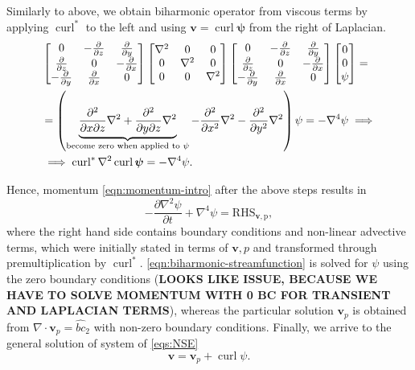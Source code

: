 \documentclass{article}
\numberwithin{equation}{section}
\begin{document}
Similarly to above, we obtain biharmonic operator from viscous terms by applying $\operatorname{curl}^*$ to the left and using $\boldsymbol{v}=\operatorname{curl}\boldsymbol{\psi}$ from the right of Laplacian.
\begin{align}\label{eqn:streamfunction-viscous}
	&\begin{bmatrix}{}
  	0& -\frac{\partial}{\partial z}&\frac{\partial}{\partial y} \\
  	\frac{\partial}{\partial z}& 0 &-\frac{\partial }{\partial x} \\
  	-\frac{\partial}{\partial y}&\frac{\partial }{\partial x} &0
	\end{bmatrix}
	\begin{bmatrix}
		\nabla^2 & 0 & 0\\
		0 & \nabla^2 & 0\\
		0 & 0 & \nabla^2
	\end{bmatrix}
	\begin{bmatrix}{}
  	0& -\frac{\partial}{\partial z}&\frac{\partial}{\partial y} \\
  	\frac{\partial}{\partial z}& 0 &-\frac{\partial }{\partial x} \\
  	-\frac{\partial}{\partial y}&\frac{\partial }{\partial x} &0
	\end{bmatrix}
	\begin{bmatrix}
		0\\
		0\\
		\psi
	\end{bmatrix}=
	\notag\\
	&=\left(\underbrace{\frac{\partial^2}{\partial x \partial z}\nabla^2 + \frac{\partial ^2}{\partial y\partial z}\nabla^2}_{\text{become zero when applied to } \psi} - \frac{\partial ^2}{\partial x^2}\nabla^2 -\frac{\partial ^2}{\partial y^2}\nabla^2\right)\psi=-\nabla^4\psi\implies
	\notag\\
	&\implies \operatorname{curl}^*\nabla^2\operatorname{curl}\boldsymbol{\psi}=-\nabla^4\psi.
\end{align}

Hence, momentum \cref{eqn:momentum-intro} after the above steps results in 
	\begin{equation}
	\label{eqn:biharmonic-streamfunction}
		\boxed{
		-\frac{\partial\nabla ^2 \psi}{\partial t} 
		+\nabla ^4 \psi=\operatorname{RHS_{\boldsymbol{v},p}},
		}
	\end{equation}
where the right hand side contains boundary conditions and non-linear advective terms, which were initially stated in terms of $\boldsymbol{v},p$ and transformed through premultiplication by $\operatorname{curl}^*$. \cref{eqn:biharmonic-streamfunction} is solved for $\psi$ using the zero boundary conditions (\textbf{LOOKS LIKE ISSUE, BECAUSE WE HAVE TO SOLVE MOMENTUM WITH 0 BC FOR TRANSIENT AND LAPLACIAN TERMS}), whereas the particular solution $\boldsymbol{v}_p$ is obtained from  $\nabla\cdot\boldsymbol{v}_p=\hat{{bc}}_2$ with non-zero boundary conditions. Finally, we arrive to the general solution of system of \cref{eqs:NSE} 
\begin{equation}
\boxed{\boldsymbol{v}=\boldsymbol{v}_p+\operatorname{curl}\psi.}
\end{equation}
\end{document}

